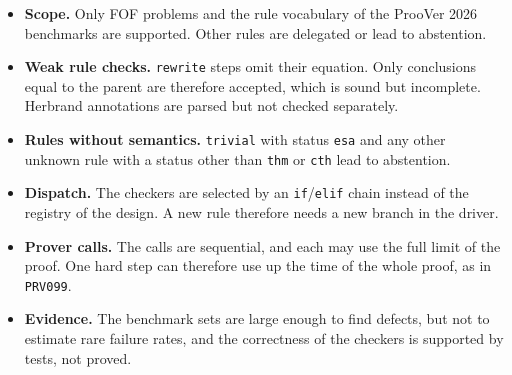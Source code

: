 \begin{itemize}
  \item \textbf{Scope.} Only FOF problems and the rule vocabulary of the ProoVer 2026 benchmarks are supported. Other rules are delegated or lead to abstention.
  \item \textbf{Weak rule checks.} \texttt{rewrite} steps omit their equation. Only conclusions equal to the parent are therefore accepted, which is sound but incomplete. Herbrand annotations are parsed but not checked separately.
  \item \textbf{Rules without semantics.} \texttt{trivial} with status \texttt{esa} and any other unknown rule with a status other than \texttt{thm} or \texttt{cth} lead to abstention.
  \item \textbf{Dispatch.} The checkers are selected by an \texttt{if}/\texttt{elif} chain instead of the registry of the design. A new rule therefore needs a new branch in the driver.
  \item \textbf{Prover calls.} The calls are sequential, and each may use the full limit of the proof. One hard step can therefore use up the time of the whole proof, as in \texttt{PRV099}.
  \item \textbf{Evidence.} The benchmark sets are large enough to find defects, but not to estimate rare failure rates, and the correctness of the checkers is supported by tests, not proved.
\end{itemize}
